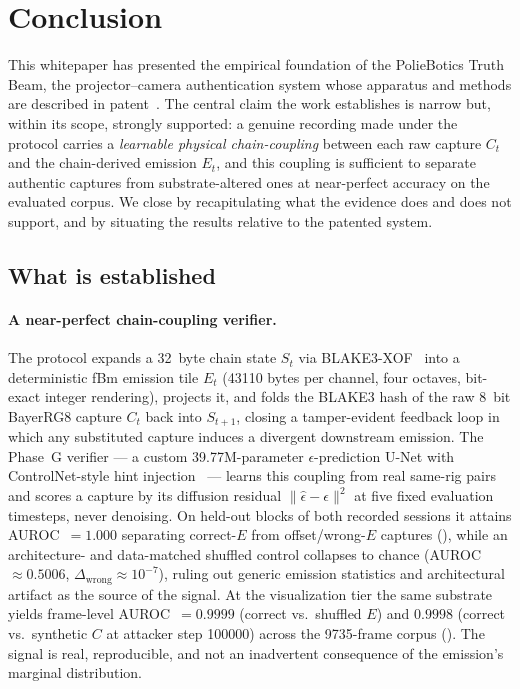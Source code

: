 \section{Conclusion}
\label{sec:conclusion}

This whitepaper has presented the empirical foundation of the PolieBotics Truth Beam, the projector--camera authentication system whose apparatus and methods are described in patent~\cite{patent2025}. The central claim the work establishes is narrow but, within its scope, strongly supported: a genuine recording made under the protocol carries a \emph{learnable physical chain-coupling} between each raw capture $C_t$ and the chain-derived emission $E_t$, and this coupling is sufficient to separate authentic captures from substrate-altered ones at near-perfect accuracy on the evaluated corpus. We close by recapitulating what the evidence does and does not support, and by situating the results relative to the patented system.

\subsection{What is established}

\paragraph{A near-perfect chain-coupling verifier.}
The protocol expands a \SI{32}{byte} chain state $S_t$ via BLAKE3-XOF~\cite{blake3} into a deterministic fBm emission tile $E_t$ (\num{43110} bytes per channel, four octaves, bit-exact integer rendering), projects it, and folds the BLAKE3 hash of the raw \SI{8}{bit} BayerRG8 capture $C_t$ back into $S_{t+1}$, closing a tamper-evident feedback loop in which any substituted capture induces a divergent downstream emission. The Phase~G verifier --- a custom \num{39.77}M-parameter $\epsilon$-prediction U-Net with ControlNet-style hint injection~\cite{ho2020ddpm,nicholdhariwal2021,zhang2023controlnet} --- learns this coupling from real same-rig pairs and scores a capture by its diffusion residual $\lVert \hat{\epsilon}-\epsilon\rVert^2$ at five fixed evaluation timesteps, never denoising. On held-out blocks of both recorded sessions it attains AUROC~$=1.000$ separating correct-$E$ from offset/wrong-$E$ captures (), while an architecture- and data-matched shuffled control collapses to chance (AUROC~$\approx 0.5006$, $\Delta_{\text{wrong}}\approx 10^{-7}$), ruling out generic emission statistics and architectural artifact as the source of the signal. At the visualization tier the same substrate yields frame-level AUROC~$=0.9999$ (correct vs.\ shuffled $E$) and $0.9998$ (correct vs.\ synthetic $C$ at attacker step \num{100000}) across the \num{9735}-frame corpus (). The signal is real, reproducible, and not an inadvertent consequence of the emission's marginal distribution.

